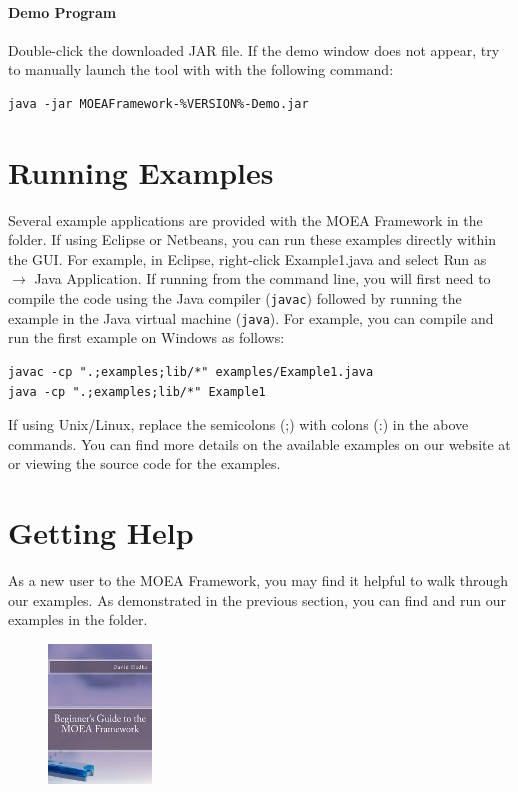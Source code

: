 \paragraph{Demo Program}
Double-click the downloaded JAR file.  If the demo window does not appear, try to manually launch the tool with with the following command:

\begin{lstlisting}[language=Plaintext]
java -jar MOEAFramework-%VERSION%-Demo.jar
\end{lstlisting}

\section{Running Examples}
Several example applications are provided with the MOEA Framework in the  folder.  If using Eclipse or Netbeans, you can run these examples directly within the GUI.  For example, in Eclipse, right-click Example1.java and select Run as $\rightarrow$ Java Application.  If running from the command line, you will first need to compile the code using the Java compiler (\texttt{javac}) followed by running the example in the Java virtual machine (\texttt{java}).  For example, you can compile and run the first example on Windows as follows:

\begin{lstlisting}[language=Plaintext]
javac -cp ".;examples;lib/*" examples/Example1.java
java -cp ".;examples;lib/*" Example1
\end{lstlisting}

\noindent
If using Unix/Linux, replace the semicolons (;) with colons (:) in the above commands.  You can find more details on the available examples on our website at  or viewing the source code for the examples.

\section{Getting Help}

As a new user to the MOEA Framework, you may find it helpful to walk through our examples.  As demonstrated in the previous section, you can find and run our examples in the  folder.

\begin{figure}
\includegraphics[]{../website/images/beginners.jpg}
\end{figure}

